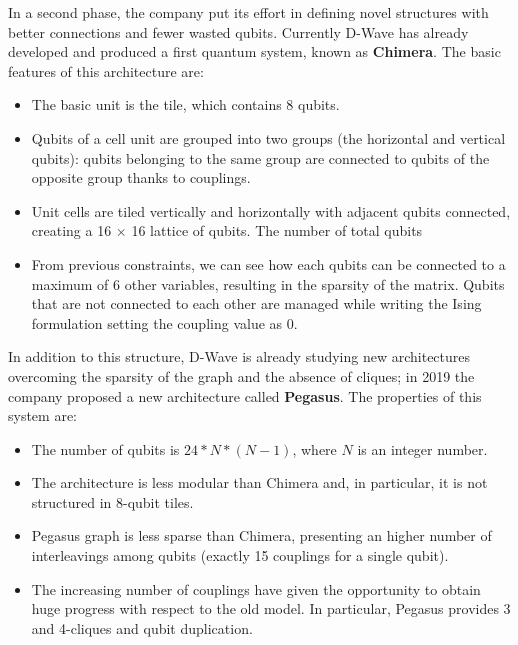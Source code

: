 In a second phase, the company put its effort in defining novel structures with better connections and fewer wasted qubits. Currently D-Wave has already developed and produced a first quantum system, known as \textbf{Chimera}. The basic features of this architecture are:

\begin{itemize}
    \item The basic unit is the tile, which contains 8 qubits.
    \item Qubits of a cell unit are grouped into two groups (the horizontal and vertical qubits): qubits belonging to the same group are connected to qubits of the opposite group thanks to couplings.
    \item Unit cells are tiled vertically and horizontally with adjacent qubits connected, creating a 16 $\times$ 16 lattice of qubits. The number of total qubits 
    \item From previous constraints, we can see how each qubits can be connected to a maximum of 6 other variables, resulting in the sparsity of the matrix. Qubits that are not connected to each other are managed while writing the Ising formulation setting the coupling value as 0.
\end{itemize}

In addition to this structure, D-Wave is already studying new architectures overcoming the sparsity of the graph and the absence of cliques; in 2019 the company proposed a new architecture called \textbf{Pegasus}. The properties of this system are:

\begin{itemize}
    \item The number of qubits is $24*N*(N-1)$, where $N$ is an integer number.
    \item The architecture is less modular than Chimera and, in particular, it is not structured in 8-qubit tiles.
    \item Pegasus graph is less sparse than Chimera, presenting an higher number of interleavings among qubits (exactly 15 couplings for a single qubit).
    \item The increasing number of couplings have given the opportunity to obtain huge progress with respect to the old model. In particular, Pegasus provides 3 and 4-cliques and qubit duplication.
\end{itemize}

